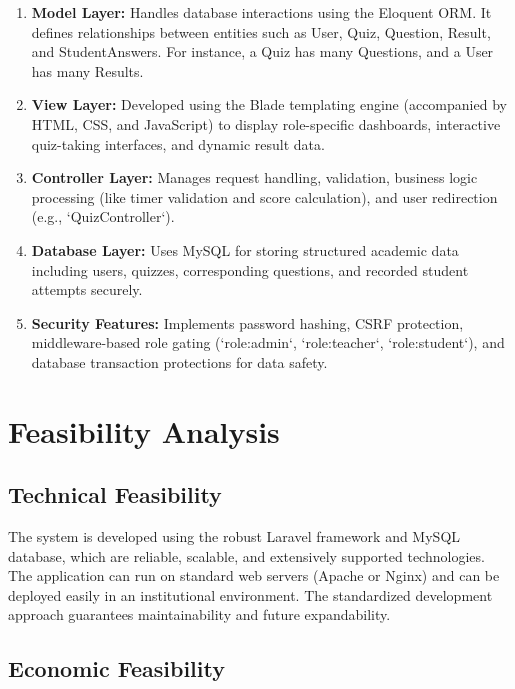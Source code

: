 \begin{enumerate}

\item \textbf{Model Layer:}
Handles database interactions using the Eloquent ORM. It defines relationships between entities such as User, Quiz, Question, Result, and StudentAnswers. For instance, a Quiz has many Questions, and a User has many Results.

\item \textbf{View Layer:}
Developed using the Blade templating engine (accompanied by HTML, CSS, and JavaScript) to display role-specific dashboards, interactive quiz-taking interfaces, and dynamic result data.

\item \textbf{Controller Layer:}
Manages request handling, validation, business logic processing (like timer validation and score calculation), and user redirection (e.g., `QuizController`).

\item \textbf{Database Layer:}
Uses MySQL for storing structured academic data including users, quizzes, corresponding questions, and recorded student attempts securely.

\item \textbf{Security Features:}
Implements password hashing, CSRF protection, middleware-based role gating (`role:admin`, `role:teacher`, `role:student`), and database transaction protections for data safety.

\end{enumerate}

\section{Feasibility Analysis}

\subsection{Technical Feasibility}

The system is developed using the robust Laravel framework and MySQL database, which are reliable, scalable, and extensively supported technologies. The application can run on standard web servers (Apache or Nginx) and can be deployed easily in an institutional environment. The standardized development approach guarantees maintainability and future expandability.

\subsection{Economic Feasibility}

